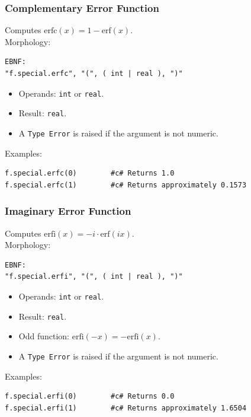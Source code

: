 \subsubsection{Complementary Error Function}
Computes $\text{erfc}(x) = 1 - \text{erf}(x)$. \\
Morphology:
\begin{verbatim}
EBNF:
"f.special.erfc", "(", ( int | real ), ")"
\end{verbatim}
\begin{itemize}
\item Operands: \texttt{int} or \texttt{real}.
\item Result: \texttt{real}.
\item A \texttt{Type Error} is raised if the argument is not numeric.
\end{itemize}
Examples:
\begin{verbatim}
f.special.erfc(0)        #c# Returns 1.0
f.special.erfc(1)        #c# Returns approximately 0.1573
\end{verbatim}

\subsubsection{Imaginary Error Function}
Computes $\text{erfi}(x) = -i \cdot \text{erf}(ix)$. \\
Morphology:
\begin{verbatim}
EBNF:
"f.special.erfi", "(", ( int | real ), ")"
\end{verbatim}
\begin{itemize}
\item Operands: \texttt{int} or \texttt{real}.
\item Result: \texttt{real}.
\item Odd function: $\text{erfi}(-x) = -\text{erfi}(x)$.
\item A \texttt{Type Error} is raised if the argument is not numeric.
\end{itemize}
Examples:
\begin{verbatim}
f.special.erfi(0)        #c# Returns 0.0
f.special.erfi(1)        #c# Returns approximately 1.6504
\end{verbatim}

